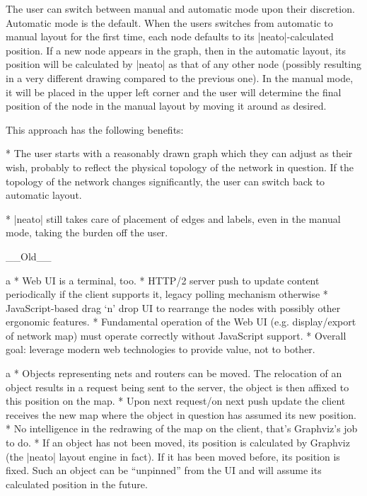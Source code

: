 The user can switch between manual and automatic mode upon their discretion.
Automatic mode is the default. When the users switches from automatic to manual
layout for the first time, each node defaults to its |neato|-calculated
position.  If a new node appears in the graph, then in the automatic layout, its
position will be calculated by |neato| as that of any other node (possibly
resulting in a very different drawing compared to the previous one). In the
manual mode, it will be placed in the upper left corner and the user will
determine the final position of the node in the manual layout by moving it
around as desired.

This approach has the following benefits:

\begitems

* The user starts with a reasonably drawn graph which they can adjust as their
wish, probably to reflect the physical topology of the network in question.  If
the topology of the network changes significantly, the user can switch back to
automatic layout.

* |neato| still takes care of placement of edges and labels, even in the manual
mode, taking the burden off the user.

\enditems

\sec __Old__

\begitems\style a
* Web UI is a terminal, too.
* HTTP/2 server push to update content periodically if the client supports it,
  legacy polling mechanism otherwise
* JavaScript-based drag `n' drop UI to rearrange the nodes with possibly other
  ergonomic features.
* Fundamental operation of the Web UI (e.g. display/export of network map)
  must operate correctly without JavaScript support.
* Overall goal: leverage modern web technologies to provide value, not to bother.
\enditems

\begitems\style a
* Objects representing nets and routers can be moved. The relocation of an object
  results in a request being sent to the server, the object is then affixed to
  this position on the map.
* Upon next request/on next push update the client receives the new map where
  the object in question has assumed its new position.
* No intelligence in the redrawing of the map on the client, that's Graphviz's
  job to do.
* If an object has not been moved, its position is calculated by Graphviz
  (the |neato| layout engine in fact). If it has been moved before, its position
  is fixed. Such an object can be ``unpinned'' from the UI and will assume its
  calculated position in the future.
\enditems

\bye
